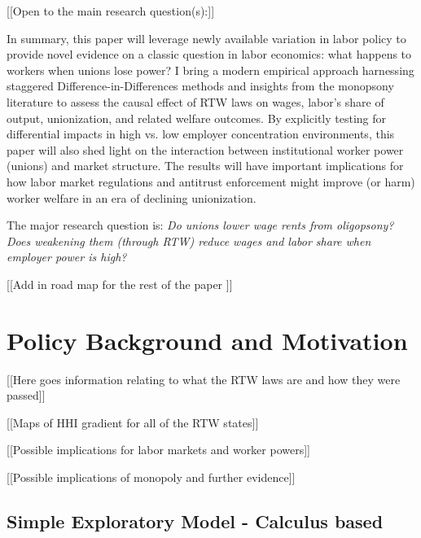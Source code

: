 \begin{center}
    [[Open to the main research question(s):]]
\end{center}

In summary, this paper will leverage newly available variation in labor policy to provide novel evidence on a classic question in labor economics: what happens to workers when unions lose power? 
I bring a modern empirical approach harnessing staggered Difference-in-Differences methods and insights from the monopsony literature to assess the causal effect of RTW laws on wages, labor’s share of output, unionization, and related welfare outcomes. 
By explicitly testing for differential impacts in high vs. low employer concentration environments, this paper will also shed light on the interaction between institutional worker power (unions) and market structure. 
The results will have important implications for how labor market regulations and antitrust enforcement might improve (or harm) worker welfare in an era of declining unionization.

The major research question is:
\emph{Do unions lower wage rents from oligopsony? Does weakening them (through RTW) reduce wages and labor share when employer power is high?}

\begin{center}
    [[Add in road map for the rest of the paper ]]
\end{center}

\section{Policy Background and Motivation}

[[Here goes information relating to what the RTW laws are and how they were passed]]

[[Maps of HHI gradient for all of the RTW states]]

[[Possible implications for labor markets and worker powers]]

[[Possible implications of monopoly and further evidence]]


\subsection{Simple Exploratory Model - Calculus based}

